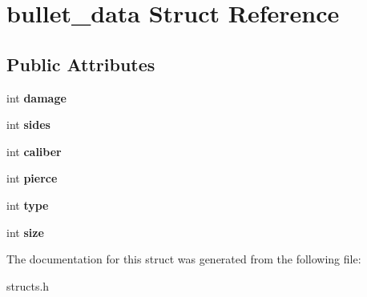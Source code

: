 \hypertarget{structbullet__data}{\section{bullet\-\_\-data Struct Reference}
\label{structbullet__data}
}
\subsection*{Public Attributes}
\begin{DoxyCompactItemize}
\item 
\hypertarget{structbullet__data_aa012aa2cf97fb23b12232add20680e3e}{int {\bfseries damage}}\label{structbullet__data_aa012aa2cf97fb23b12232add20680e3e}

\item 
\hypertarget{structbullet__data_a590bb73ffd2f62831761cc9ee4b25571}{int {\bfseries sides}}\label{structbullet__data_a590bb73ffd2f62831761cc9ee4b25571}

\item 
\hypertarget{structbullet__data_a4cd2f8ddc9532be2c419bd9c72d40d0c}{int {\bfseries caliber}}\label{structbullet__data_a4cd2f8ddc9532be2c419bd9c72d40d0c}

\item 
\hypertarget{structbullet__data_a510d249b12de0b08f29567e685114a62}{int {\bfseries pierce}}\label{structbullet__data_a510d249b12de0b08f29567e685114a62}

\item 
\hypertarget{structbullet__data_aa53aba68ad086bfd4ee338ca31b71e84}{int {\bfseries type}}\label{structbullet__data_aa53aba68ad086bfd4ee338ca31b71e84}

\item 
\hypertarget{structbullet__data_a049788b480ffdab91337c896044676d0}{int {\bfseries size}}\label{structbullet__data_a049788b480ffdab91337c896044676d0}

\end{DoxyCompactItemize}


The documentation for this struct was generated from the following file\-:\begin{DoxyCompactItemize}
\item 
structs.\-h\end{DoxyCompactItemize}
